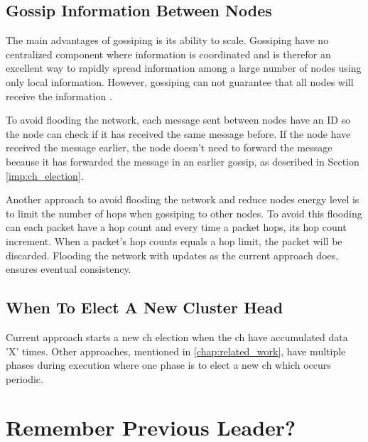 \documentclass[USenglish]{uit-thesis}
\begin{document}


\subsection{Gossip Information Between Nodes}
The main advantages of gossiping is its ability to scale. Gossiping have no centralized component where information is coordinated and is therefor an excellent way to rapidly spread information among a large number of nodes using only local information. However, gossiping can not guarantee that all nodes will receive the information \cite{demers}.

To avoid flooding the network, each message sent between nodes have an ID so the node can check if it has received the same message before. If the node have received the message earlier, the node doesn't need to forward the message because it has forwarded the message in an earlier gossip, as described in Section \ref{imp:ch_election}.

Another approach to avoid flooding the network and reduce nodes energy level is to limit the number of hops when gossiping to other nodes. To avoid this flooding can each packet have a hop count and every time a packet hops, its hop count increment. When a packet's hop counts equals a hop limit, the packet will be discarded. Flooding the network with updates as the current approach does, ensures eventual consistency.
 

\subsection{When To Elect A New Cluster Head}
Current approach starts a new \gls{ch} election when the \gls{ch} have accumulated data 'X' times.
Other approaches, mentioned in \ref{chap:related_work}, have multiple phases during execution where one phase is to elect a new \gls{ch} which occurs periodic.


\section{Remember Previous Leader?}
\end{document}
